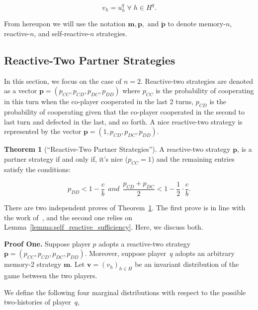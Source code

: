 \documentclass{article}
\theoremstyle{definition}
\newtheorem{theorem}{Theorem}[section]
\begin{document}
\begin{equation}
  v_{h} = u^q_{h} \; \forall \; h \in H^q.
\end{equation}

From hereupon we will use the notation $\mathbf{m}, \mathbf{p}, \text{ and }
\mathbf{\tilde{p}}$ to denote memory-$n$, reactive-$n$, and self-reactive-$n$
strategies.

\subsection{Reactive-Two Partner Strategies}

In this section, we focus on the case of $n=2$. Reactive-two strategies are denoted as a vector
$\mathbf{p}=(p_{CC}, p_{CD}, p_{DC}, p_{DD})$ where $p_{CC}$ is the
probability of cooperating in this turn when the co-player cooperated in the
last 2 turns, $p_{CD}$ is the probability of cooperating given that the
co-player cooperated in the second to last turn and defected in the last, and so
forth. A nice reactive-two strategy is represented by the vector $\mathbf{p}=(1,
p_{CD}, p_{DC}, p_{DD})$.

\begin{theorem}[``Reactive-Two Partner Strategies'']\label{theorem:reactive_two_partner_strategies}
A reactive-two strategy $\mathbf{p}$, is a partner strategy if and only if,
it's nice ($p_{CC} = 1$) and the remaining entries satisfy the conditions:

\begin{equation}\label{eq:two_bit_conditions}
  \displaystyle p_{DD} < 1\!-\! \frac{c}{b}  ~~and~~ \displaystyle \frac{p_{CD} + p_{DC}}{2} < 1- \frac{1}{2} \cdot \frac{c}{b}.
\end{equation}
\end{theorem}

There are two independent proves of
Theorem~\ref{theorem:reactive_two_partner_strategies}. The first prove is
in line with the work of~\citep{akin:EGADS:2016}, and the second one relies on
Lemma~\ref{lemma:self_reactive_sufficiency}. Here, we discuss both.

{\bf Proof One.} Suppose player $p$ adopts a
reactive-two strategy $\mathbf{p}\!=\!(p_{CC},p_{CD}, p_{DC}, p_{DD})$.
Moreover, suppose player~$q$ adopts an arbitrary memory-2 strategy $\mathbf{m}$.
Let $\mathbf{v}=(v_h)_{h\in H}$ be an invariant distribution of the game between
the two players.

We define the following four marginal distributions with respect to the possible two-histories of player~$q$,
\end{document}
